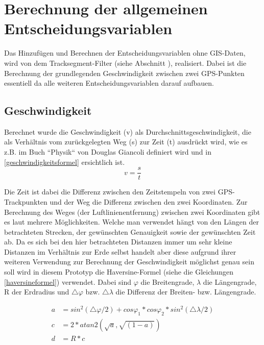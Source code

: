 \section{Berechnung der allgemeinen Entscheidungsvariablen}
Das Hinzufügen und Berechnen der Entscheidungsvariablen ohne GIS-Daten, wird von dem Tracksegment-Filter (siehe Abschnitt ), realisiert. Dabei ist die Berechnung der grundlegenden Geschwindigkeit zwischen zwei GPS-Punkten essentiell da alle weiteren Entscheidungsvariablen darauf aufbauen. 

\subsection{Geschwindigkeit}
Berechnet wurde die Geschwindigkeit (v) als Durchschnittsgeschwindigkeit, die als Verhältnis vom zurückgelegten Weg (s) zur Zeit (t) ausdrückt wird, wie es z.B. im Buch ``Physik`` von Douglas Giancoli definiert wird \cite[S.~27]{douglas_giancoli_physik_2010} und in \ref{geschwindigkeitsformel} ersichtlich ist. 
\begin{equation}
v = \frac{s}{t}
\label{geschwindigkeitsformel}
\end{equation}

Die Zeit ist dabei die Differenz zwischen den Zeitstempeln von zwei GPS-Trackpunkten und der Weg die Differenz zwischen den zwei Koordinaten. Zur Berechnung des Weges (der Luftlinienentfernung) zwischen zwei Koordinaten gibt es laut \cite{movable_type_ltd_calculate_2015} mehrere Möglichkeiten. Welche man verwendet hängt von den Längen der betrachteten Strecken, der gewünschten Genauigkeit sowie der gewünschten Zeit ab. Da es sich bei den hier betrachteten Distanzen immer um sehr kleine Distanzen im Verhältnis zur Erde selbst handelt aber diese aufgrund ihrer weiteren Verwendung zur Berechnung der Geschwindigkeit möglichst genau sein soll wird in diesem Prototyp die Haversine-Formel (siehe die Gleichungen \ref{haversineformel}) verwendet. Dabei sind $\varphi$ die Breitengrade, $\lambda$ die Längengrade, R der Erdradius und $\triangle\varphi$ bzw. $\triangle \lambda$ die Differenz der Breiten- bzw. Längengrade.\cite{movable_type_ltd_calculate_2015}

\begin{equation}
\label{haversineformel}
\begin{aligned}
a &= sin^{2}(\triangle \varphi/2) + cos \varphi_1  * cos \varphi_2 * sin^{2}(\triangle \lambda/2) \\
c &= 2 * atan2( \sqrt{a}, \sqrt{(1-a)}) \\
d &= R * c
\end{aligned}
\end{equation}

